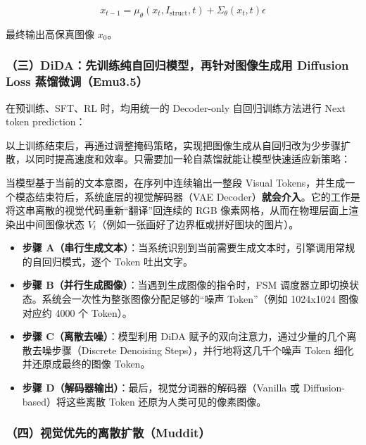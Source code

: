 \[
x_{t-1}=\mu_{\theta}(x_t,I_{\mathrm{struct}},t)+\Sigma_{\theta}(x_t,t)\epsilon
\]

最终输出高保真图像 \(x_0\)。

\hypertarget{ux4e09didaux5148ux8badux7ec3ux7eafux81eaux56deux5f52ux6a21ux578bux518dux9488ux5bf9ux56feux50cfux751fux6210ux7528-diffusion-loss-ux84b8ux998fux5faeux8c03emu3.5}{%
\subsubsection{（三）DiDA：先训练纯自回归模型，再针对图像生成用 Diffusion Loss 蒸馏微调（Emu3.5）}\label{ux4e09didaux5148ux8badux7ec3ux7eafux81eaux56deux5f52ux6a21ux578bux518dux9488ux5bf9ux56feux50cfux751fux6210ux7528-diffusion-loss-ux84b8ux998fux5faeux8c03emu3.5}}

在预训练、SFT、RL 时，均用统一的 Decoder-only 自回归训练方法进行 Next token prediction：

以上训练结束后，再通过调整掩码策略，实现把图像生成从自回归改为少步骤扩散，以同时提高速度和效率。只需要加一轮自蒸馏就能让模型快速适应新策略：

当模型基于当前的文本意图，在序列中连续输出一整段 Visual Tokens，并生成一个模态结束符后，系统底层的视觉解码器（VAE Decoder）\textbf{就会介入}。它的工作是将这串离散的视觉代码重新``翻译''回连续的 RGB 像素网格，从而在物理层面上渲染出中间图像状态 \(V_t\)（例如一张画好了边界框或拼好图块的图片）。

\begin{itemize}
\tightlist
\item
  \textbf{步骤 A（串行生成文本）}：当系统识别到当前需要生成文本时，引擎调用常规的自回归模式，逐个 Token 吐出文字。
\item
  \textbf{步骤 B（并行生成图像）}：当遇到生成图像的指令时，FSM 调度器立即切换状态。系统会一次性为整张图像分配足够的``噪声 Token''（例如 1024x1024 图像对应约 4000 个 Token）。
\item
  \textbf{步骤 C（离散去噪）}：模型利用 DiDA 赋予的双向注意力，通过少量的几个离散去噪步骤（Discrete Denoising Steps），并行地将这几千个噪声 Token 细化并还原成最终的图像 Token。
\item
  \textbf{步骤 D（解码器输出）}：最后，视觉分词器的解码器（Vanilla 或 Diffusion-based）将这些离散 Token 还原为人类可见的像素图像。
\end{itemize}

\hypertarget{ux56dbux89c6ux89c9ux4f18ux5148ux7684ux79bbux6563ux6269ux6563muddit}{%
\subsubsection{（四）视觉优先的离散扩散（Muddit）}\label{ux56dbux89c6ux89c9ux4f18ux5148ux7684ux79bbux6563ux6269ux6563muddit}}

